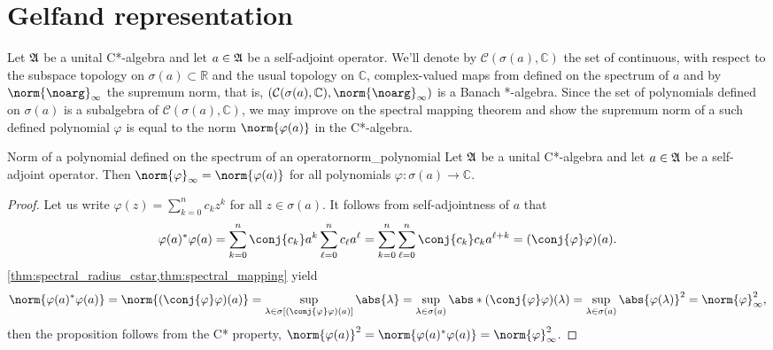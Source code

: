 \section{Gelfand representation}
Let \(\mathfrak{A}\) be a unital C*-algebra and let \(a \in \mathfrak{A}\) be a self-adjoint operator. We'll denote by \(\mathcal{C}(\sigma(a), \mathbb{C})\) the set of continuous, with respect to the subspace topology on \(\sigma(a) \subset \mathbb{R}\) and the usual topology on \(\mathbb{C}\), complex-valued maps from defined on the spectrum of \(a\) and by \(\norm{\noarg}_{\infty}\) the supremum norm, that is, \(\left(\mathcal{C}(\sigma(a), \mathbb{C}), \norm{\noarg}_{\infty}\right)\) is a Banach *-algebra. Since the set of polynomials defined on \(\sigma(a)\) is a subalgebra of \(\mathcal{C}(\sigma(a), \mathbb{C})\), we may improve on the spectral mapping theorem and show the supremum norm of a such defined polynomial \(\varphi\) is equal to the norm \(\norm{\varphi(a)}\) in the C*-algebra.
\begin{proposition}{Norm of a polynomial defined on the spectrum of an operator}{norm_polynomial}
    Let \(\mathfrak{A}\) be a unital C*-algebra and let \(a \in \mathfrak{A}\) be a self-adjoint operator. Then \(\norm{\varphi}_\infty = \norm{\varphi(a)}\) for all polynomials \(\varphi : \sigma(a) \to \mathbb{C}\).
\end{proposition}
\begin{proof}
    Let us write \(\varphi(z) = \sum_{k = 0}^{n} c_k z^k\) for all \(z \in \sigma(a)\). It follows from self-adjointness of \(a\) that
    \begin{equation*}
        \varphi(a)^*\varphi(a) = \sum_{k=0}^n \conj{c_k} a^k \sum_{\ell = 0}^n c_{\ell} a^\ell = \sum_{k = 0}^n \sum_{\ell = 0}^n \conj{c_k} c_k a^{\ell + k} = (\conj{\varphi}\varphi)(a).
    \end{equation*}
    \cref{thm:spectral_radius_cstar,thm:spectral_mapping} yield
    \begin{equation*}
        \norm{\varphi(a)^*\varphi(a)} = \norm{(\conj{\varphi}\varphi)(a)} = \sup_{\lambda \in \sigma\left[(\conj{\varphi}\varphi)(a)\right]}{\abs{\lambda}} = \sup_{\lambda \in \sigma(a)}{\abs*{(\conj{\varphi}\varphi)(\lambda)}} = \sup_{\lambda\in \sigma(a)}{\abs{\varphi(\lambda)}^2} = \norm{\varphi}_{\infty}^2,
    \end{equation*}
    then the proposition follows from the C* property, \(\norm{\varphi(a)}^2 = \norm{\varphi(a)^*\varphi(a)} = \norm{\varphi}_{\infty}^2\).
\end{proof}

